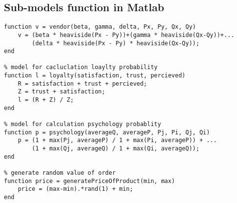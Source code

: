 \subsection{Sub-models function in Matlab} \label{subsec:matlab-sub-models}
\begin{lstlisting}[language=mcode]
% model for calculation vendor probability
function v = vendor(beta, gamma, delta, Px, Py, Qx, Qy)
    v = (beta * heaviside(Px - Py))+(gamma * heaviside(Qx-Qy))+...
        (delta * heaviside(Px - Py) * heaviside(Qx-Qy));
end

% model for cacluclation loaylty probability
function l = loyalty(satisfaction, trust, percieved)
    R = satisfaction + trust + percieved;
    Z = trust + satisfaction;
    l = (R + Z) / Z;
end

% model for calculation psychology probablity
function p = psychology(averageQ, averageP, Pj, Pi, Qj, Qi)
    p = (1 + max(Pj, averageP) / 1 + max(Pi, averageP)) + ...
        (1 + max(Qj, averageQ) / 1 + max(Qi, averageQ));
end

% generate random value of order
function price = generatePriceOfProduct(min, max)
    price = (max-min).*rand(1) + min;
end
\end{lstlisting}\\

